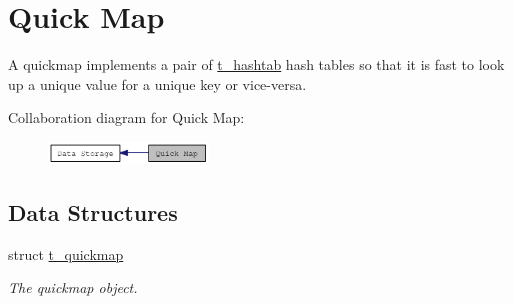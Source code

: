\hypertarget{group__quickmap}{
\section{Quick Map}
\label{group__quickmap}
}


A quickmap implements a pair of \hyperlink{structt__hashtab}{t\_\-hashtab} hash tables so that it is fast to look up a unique value for a unique key or vice-\/versa.  


Collaboration diagram for Quick Map:\nopagebreak
\begin{figure}[H]
\begin{center}
\leavevmode
\includegraphics[width=121pt]{group__quickmap}
\end{center}
\end{figure}
\subsection*{Data Structures}
\begin{DoxyCompactItemize}
\item 
struct \hyperlink{structt__quickmap}{t\_\-quickmap}
\begin{DoxyCompactList}\small\item\em The quickmap object. \item\end{DoxyCompactList}\end{DoxyCompactItemize}
